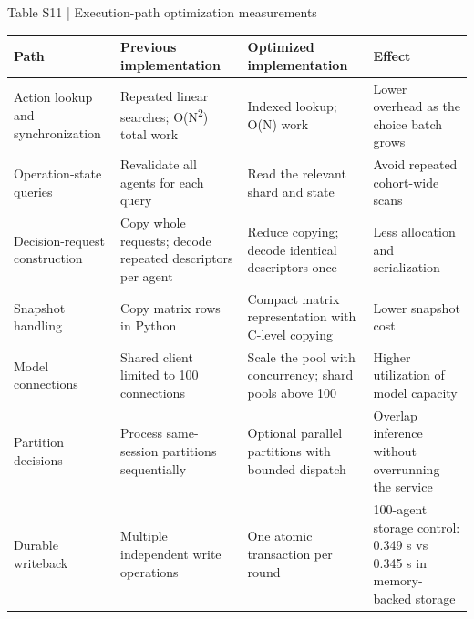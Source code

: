\documentclass[10pt]{article}
\begin{document}
\begin{center}
\begin{minipage}{\textwidth}
\fontsize{8.5}{10.3}\selectfont
Table S11 | Execution-path optimization measurements
\par\vspace{4pt}
\begin{tabularx}{\textwidth}{@{}XXXX@{}}
\toprule
Path & Previous implementation & Optimized implementation & Effect \\
\midrule
Action lookup and synchronization & Repeated linear searches; O(N\textsuperscript{2}) total work & Indexed lookup; O(N) work & Lower overhead as the choice batch grows \\
Operation-state queries & Revalidate all agents for each query & Read the relevant shard and state & Avoid repeated cohort-wide scans \\
Decision-request construction & Copy whole requests; decode repeated descriptors per agent & Reduce copying; decode identical descriptors once & Less allocation and serialization \\
Snapshot handling & Copy matrix rows in Python & Compact matrix representation with C-level copying & Lower snapshot cost \\
Model connections & Shared client limited to 100 connections & Scale the pool with concurrency; shard pools above 100 & Higher utilization of model capacity \\
Partition decisions & Process same-session partitions sequentially & Optional parallel partitions with bounded dispatch & Overlap inference without overrunning the service \\
Durable writeback & Multiple independent write operations & One atomic transaction per round & 100-agent storage control: 0.349 s vs 0.345 s in memory-backed storage \\
\bottomrule
\end{tabularx}
\end{minipage}
\end{center}
\end{document}
